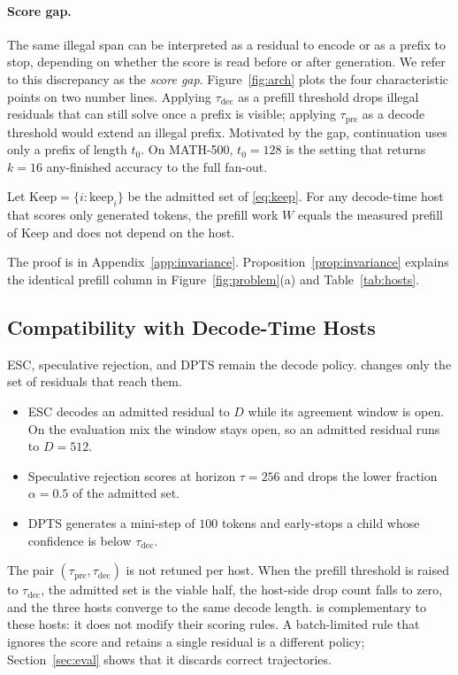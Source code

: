 \paragraph{Score gap.}
The same illegal span can be interpreted as a residual to encode or as a prefix to stop, depending on whether the score is read before or after generation.
We refer to this discrepancy as the \emph{score gap}.
Figure~\ref{fig:arch} plots the four characteristic points on two number lines.
Applying $\tau_{\mathrm{dec}}$ as a prefill threshold drops illegal residuals that can still solve once a prefix is visible; applying $\tau_{\mathrm{pre}}$ as a decode threshold would extend an illegal prefix.
Motivated by the gap, continuation uses only a prefix of length $t_0$.
On MATH-500, $t_0{=}128$ is the setting that returns $k{=}16$ any-finished accuracy to the full fan-out.

\begin{proposition}
\label{prop:invariance}
Let $\mathrm{Keep}=\{i:\mathrm{keep}_i\}$ be the admitted set of \eqref{eq:keep}.
For any decode-time host that scores only generated tokens, the prefill work $W$ equals the measured prefill of $\mathrm{Keep}$ and does not depend on the host.
\end{proposition}
The proof is in Appendix~\ref{app:invariance}.
Proposition~\ref{prop:invariance} explains the identical prefill column in Figure~\ref{fig:problem}(a) and Table~\ref{tab:hosts}.

\subsection{Compatibility with Decode-Time Hosts}
\label{sec:hosts}

ESC, speculative rejection, and DPTS remain the decode policy.
\sys changes only the set of residuals that reach them.
\begin{itemize}
  \item ESC decodes an admitted residual to $D$ while its agreement window is open.
    On the evaluation mix the window stays open, so an admitted residual runs to $D{=}512$.
  \item Speculative rejection scores at horizon $\tau{=}256$ and drops the lower fraction $\alpha{=}0.5$ of the admitted set.
  \item DPTS generates a mini-step of $100$ tokens and early-stops a child whose confidence is below $\tau_{\mathrm{dec}}$.
\end{itemize}
The pair $(\tau_{\mathrm{pre}},\tau_{\mathrm{dec}})$ is not retuned per host.
When the prefill threshold is raised to $\tau_{\mathrm{dec}}$, the admitted set is the viable half, the host-side drop count falls to zero, and the three hosts converge to the same decode length.
\sys is complementary to these hosts: it does not modify their scoring rules.
A batch-limited rule that ignores the score and retains a single residual is a different policy; Section~\ref{sec:eval} shows that it discards correct trajectories.

